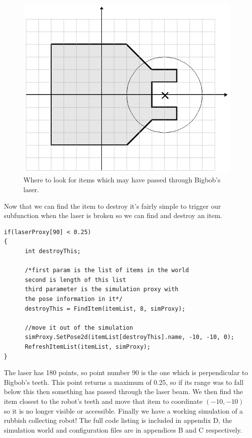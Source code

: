 \documentclass[a4paper]{article}
\begin{document}
\begin{figure}
	\centering
	\includegraphics[width=0.7\linewidth]{./pics/coding/bigbob_radius.png}
	\caption{Where to look for items which may have passed through Bigbob's laser.}
	\label{fig:bigboblaserradius}
\end{figure} 

Now that we can find the item to destroy it's fairly simple to trigger our subfunction when the laser is broken so we can find and destroy an item.
\begin{verbatim}
if(laserProxy[90] < 0.25)
{
      int destroyThis;

      /*first param is the list of items in the world
      second is length of this list
      third parameter is the simulation proxy with 
      the pose information in it*/
      destroyThis = FindItem(itemList, 8, simProxy);
 
      //move it out of the simulation
      simProxy.SetPose2d(itemList[destroyThis].name, -10, -10, 0);
      RefreshItemList(itemList, simProxy);
}
\end{verbatim}
The laser has 180 points, so point number 90 is the one which is perpendicular to Bigbob's teeth. This point returns a maximum of 0.25, so if its range was to fall below this then something has passed through the laser beam. We then find the item closest to the robot's teeth and move that item to coordinate $(-10, -10)$ so it is no longer visible or accessible.
\newline
Finally we have a working simulation of a rubbish collecting robot! The full code listing is included in appendix D, the simulation world and configuration files are in appendices B and C respectively.
\end{document}

